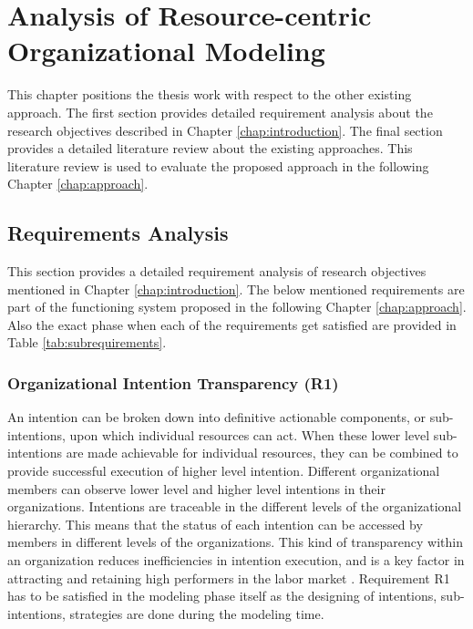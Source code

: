\chapter{Analysis of Resource-centric Organizational Modeling}
\label{chap:analysis}
This chapter positions the thesis work with respect to the other existing approach. The first section provides detailed requirement analysis about the research objectives described in Chapter \ref{chap:introduction}. The final section provides a detailed literature review about the existing approaches. This literature review is used to evaluate the proposed approach in the following Chapter \ref{chap:approach}.

\section{Requirements Analysis}
\label{sec:requirementssupoorting}
This section provides a detailed requirement analysis of research objectives mentioned in Chapter \ref{chap:introduction}. The below mentioned requirements are part of the functioning system proposed in the following Chapter \ref{chap:approach}. Also the exact phase when each of the requirements get satisfied are provided in Table \ref{tab:subrequirements}.

\subsection{Organizational Intention Transparency (R1)}
An intention can be broken down into definitive actionable components, or sub-intentions, upon which individual resources can act. When these lower level sub-intentions are made  achievable for individual resources, they can be combined to provide successful execution of higher level intention. Different organizational members can observe lower level and higher level intentions in their organizations. Intentions are traceable in the different levels of the organizational hierarchy. This means that the status of each intention can be accessed by members in different levels of the organizations. This kind of transparency within an organization reduces inefficiencies in intention execution, and is a key factor in attracting and retaining high  performers in the labor market \cite{McManus2007}. Requirement R1 has to be satisfied in the modeling phase itself as the designing of intentions, sub-intentions, strategies are done during the modeling time. 

